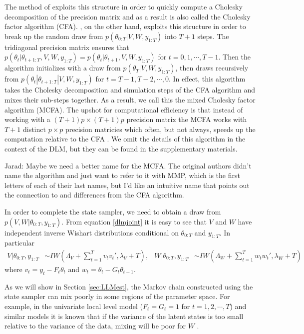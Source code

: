 \documentclass{article}
\newcommand{\jarad}[1]{{\color{red} Jarad: #1}}
\begin{document}
The method of  exploits this structure in order to quickly compute a Cholesky decomposition of the precision matrix and as a result is also called the Cholesky factor algorithm (CFA). , on the other hand, exploits this structure in order to break up the random draw from $p(\theta_{0:T}|V,W,y_{1:T})$ into $T+1$ steps. The tridiagonal precision matrix ensures that $p(\theta_{t}|\theta_{t+1:T},V,W,y_{1:T}) = p(\theta_{t}|\theta_{t+1},V,W,y_{1:T})$ for $t=0,1,\cdots,T-1$. Then the algorithm initializes with a draw from $p(\theta_T|V,W,y_{1:T})$, then draws recursively from $p(\theta_{t}|\theta_{t+1:T}|V,W,y_{1:T})$ for $t=T-1,T-2,\cdots,0$. In effect, this algorithm takes the Cholesky decomposition and simulation steps of the CFA algorithm and mixes their sub-steps together.  As a result, we call this the mixed Cholesky factor algorithm (MCFA). The upshot for computational efficiency is that instead of working with a $(T+1)p\times (T+1)p$ precision matrix the MCFA works with $T+1$ distinct $p\times p$ precision matricies which often, but not always, speeds up the computation relative to the CFA \cite{mccausland2011simulation}. We omit the details of this algorithm in the context of the DLM, but they can be found in the supplementary materials.

\jarad{Maybe we need a better name for the MCFA. The original authors didn't name the algorithm and just want to refer to it with MMP, which is the first letters of each of their last names, but I'd like an intuitive name that points out the connection to and differences from the CFA algorithm.}

In order to complete the state sampler, we need to obtain a draw from $p(V,W|\theta_{0:T},y_{1:T})$. From equation \ref{dlmjoint} it is easy to see that $V$ and $W$ have independent inverse Wishart distributions conditional on $\theta_{0:T}$ and $y_{1:T}$. In particular
\begin{align*}
  V|\theta_{0:T},y_{1:T} &\sim IW\left(\Lambda_V + \sum_{t=1}^Tv_tv_t',\lambda_V + T\right), &
  W|\theta_{0:T},y_{1:T} &\sim IW\left(\Lambda_W + \sum_{t=1}^Tw_tw_t',\lambda_{W} + T\right) %
\end{align*}
where $v_t = y_t - F_t\theta_t$ and $w_t = \theta_t - G_t\theta_{t-1}$.

As we will show in Section \ref{sec:LLMest}, the Markov chain constructed using the state sampler can mix poorly in some regions of the parameter space. For example, in the univariate local level model ($F_t=G_t=1$ for $t=1,2,\cdots,T$) and similar models it is known that if the variance of the latent states is too small relative to the variance of the data, mixing will be poor for $W$ \cite{fruhwirth2004efficient}.
\end{document}
